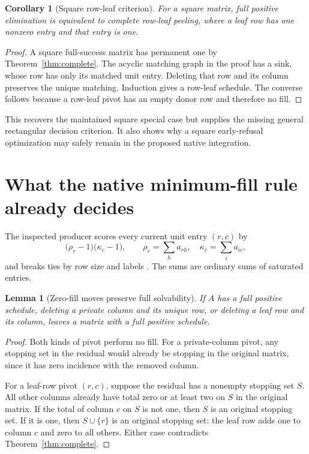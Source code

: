 \documentclass[11pt]{article}
\newtheorem{lemma}[theorem]{Lemma}
\newtheorem{corollary}[theorem]{Corollary}
\theoremstyle{definition}\newtheorem{definition}[theorem]{Definition}
\theoremstyle{remark}\newtheorem{remark}[theorem]{Remark}
\begin{document}
\begin{corollary}[Square row-leaf criterion]
\label{cor:square}
For a square matrix, full positive elimination is equivalent to complete row-leaf peeling, where a leaf row has one nonzero entry and that entry is one.
\end{corollary}
\begin{proof}
A square full-success matrix has permanent one by Theorem~\ref{thm:complete}. The acyclic matching graph in the proof has a sink, whose row has only its matched unit entry. Deleting that row and its column preserves the unique matching. Induction gives a row-leaf schedule. The converse follows because a row-leaf pivot has an empty donor row and therefore no fill.
\end{proof}

This recovers the maintained square special case \cite{repo-core} but supplies the missing general rectangular decision criterion. It also shows why a square early-refusal optimization may safely remain in the proposed native integration.

\section{What the native minimum-fill rule already decides}
\label{sec:greedy}
The inspected producer scores every current unit entry $(r,c)$ by
\begin{equation}
 \bigl(\rho_r-1\bigr)\bigl(\kappa_c-1\bigr),\qquad
 \rho_r=\sum_h a_{rh},\quad \kappa_c=\sum_i a_{ic},
 \label{eq:score}
\end{equation}
and breaks ties by row size and labels \cite{repo-core}. The sums are ordinary sums of saturated entries.

\begin{lemma}[Zero-fill moves preserve full solvability]
\label{lem:zerofill}
If $A$ has a full positive schedule, deleting a private column and its unique row, or deleting a leaf row and its column, leaves a matrix with a full positive schedule.
\end{lemma}
\begin{proof}
Both kinds of pivot perform no fill. For a private-column pivot, any stopping set in the residual would already be stopping in the original matrix, since it has zero incidence with the removed column.

For a leaf-row pivot $(r,c)$, suppose the residual has a nonempty stopping set $S$. All other columns already have total zero or at least two on $S$ in the original matrix. If the total of column $c$ on $S$ is not one, then $S$ is an original stopping set. If it is one, then $S\cup\{r\}$ is an original stopping set: the leaf row adds one to column $c$ and zero to all others. Either case contradicts Theorem~\ref{thm:complete}.
\end{proof}
\end{document}
